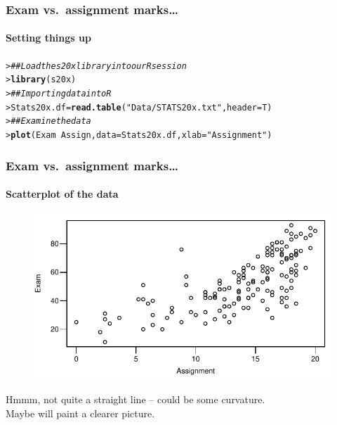 \documentclass{beamer}\usepackage[]{graphicx}\usepackage[]{xcolor}
\makeatletter
\newcommand{\hlstr}[1]{\textcolor[rgb]{0.192,0.494,0.8}{#1}}%
\newcommand{\hlcom}[1]{\textcolor[rgb]{0.678,0.584,0.686}{\textit{#1}}}%
\newcommand{\hlopt}[1]{\textcolor[rgb]{0,0,0}{#1}}%
\newcommand{\hlstd}[1]{\textcolor[rgb]{0.345,0.345,0.345}{#1}}%
\newcommand{\hlkwb}[1]{\textcolor[rgb]{0.69,0.353,0.396}{#1}}%
\newcommand{\hlkwc}[1]{\textcolor[rgb]{0.333,0.667,0.333}{#1}}%
\newcommand{\hlkwd}[1]{\textcolor[rgb]{0.737,0.353,0.396}{\textbf{#1}}}%
\newenvironment{kframe}{%
 \def\at@end@of@kframe{}%
 \ifinner\ifhmode%
  \def\at@end@of@kframe{\end{minipage}}%
  \begin{minipage}{\columnwidth}%
 \fi\fi%
 \def\FrameCommand##1{\hskip\@totalleftmargin \hskip-\fboxsep
 \colorbox{shadecolor}{##1}\hskip-\fboxsep
     \hskip-\linewidth \hskip-\@totalleftmargin \hskip\columnwidth}%
 \MakeFramed {\advance\hsize-\width
   \@totalleftmargin\z@ \linewidth\hsize
   \@setminipage}}%
 {\par\unskip\endMakeFramed%
 \at@end@of@kframe}
\newenvironment{knitrout}{}{} %
\makeatother
\begin{document}
\begin{frame}[fragile]
\frametitle{Exam vs.\ assignment marks\ldots}
\framesubtitle{Setting things up}
\begin{knitrout}\scriptsize
{}\color{fgcolor}\begin{kframe}
\begin{alltt}
\hlstd{> }\hlcom{## Load the s20x library into our R session}
\hlstd{> }\hlkwd{library}\hlstd{(s20x)}
\hlstd{> }\hlcom{## Importing data into R}
\hlstd{> }\hlstd{Stats20x.df} \hlkwb{=} \hlkwd{read.table}\hlstd{(}\hlstr{"Data/STATS20x.txt"}\hlstd{,} \hlkwc{header}\hlstd{=T)}
\hlstd{> }\hlcom{## Examine the data}
\hlstd{> }\hlkwd{plot}\hlstd{(Exam} \hlopt{~} \hlstd{Assign,} \hlkwc{data} \hlstd{= Stats20x.df,}\hlkwc{xlab}\hlstd{=}\hlstr{"Assignment"}\hlstd{)}
\end{alltt}
\end{kframe}
\end{knitrout}
\end{frame}


\begin{frame}[fragile]
\frametitle{Exam vs.\ assignment marks\ldots}
\framesubtitle{Scatterplot of the data}


\begin{figure}
  \centering
  \includegraphics{figure/RC-H04-002}
\end{figure}

Hmmm, not quite a straight line -- could be some curvature. \\
Maybe  will paint a clearer picture.

\end{frame}
\end{document}
